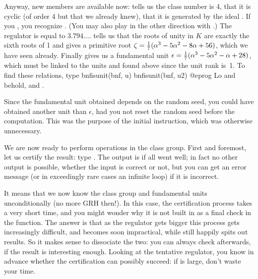 Anyway, new members are available now:  tells us the class number
is 4,  that it is cyclic (of order 4 but that we already knew),
 that it is generated by the ideal . If you
, you recognize . (You may also play in
the other direction with .) The regulator  is
equal to $3.794\dots$.  tells us that the roots of unity in $K$
are exactly the sixth roots of 1 and gives a primitive root $\zeta =
{1\over7}(\alpha^3 - 5\alpha^2 - 8\alpha + 56)$, which we have seen already.
Finally  gives us a fundamental unit $\epsilon =
{1\over7}(\alpha^3 - 5\alpha^2 - \alpha + 28)$, which must be linked to the
units  and  found above since the unit rank is~1. To find
these relations, type
\bprog
  bnfisunit(bnf, u)
  bnfisunit(bnf, u2)
@eprog\noindent
Lo and behold,  and .

 Since the fundamental unit obtained depends on the random
seed, you could have obtained another unit than $\epsilon$, had you not reset
the random seed before the computation. This was the purpose of the initial
 instruction, which was otherwise unnecessary.\medskip

We are now ready to perform operations in the class group. First and
foremost, let us certify the result: type . The
output is  if all went well; in fact no other output is possible,
whether the input is correct or not, but you can get an error message (or in
exceedingly rare cases an infinite loop) if it is incorrect.

It means that we now know the class group and fundamental units
unconditionally (no more GRH then!). In this case, the certification process
takes a very short time, and you might wonder why it is not built in as a
final check in the  function. The answer is that as the
regulator gets bigger this process gets increasingly difficult, and becomes
soon impractical, while  still happily spits out results. So it
makes sense to dissociate the two: you can always check afterwards, if the
result is interesting enough. Looking at the tentative regulator, you know in
advance whether the certification can possibly succeed: if  is
large, don't waste your time.


